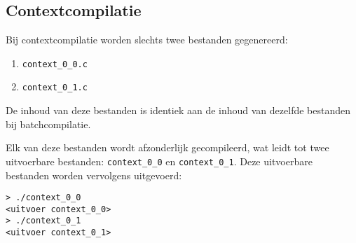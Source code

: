 \subsection{Contextcompilatie}\label{subsec:echo-contextcompilatie}

Bij contextcompilatie worden slechts twee bestanden gegenereerd:

\begin{enumerate}
    \item \texttt{context\_0\_0.c}
    \item \texttt{context\_0\_1.c}
\end{enumerate}

De inhoud van deze bestanden is identiek aan de inhoud van dezelfde bestanden bij batchcompilatie.

Elk van deze bestanden wordt afzonderlijk gecompileerd, wat leidt tot twee uitvoerbare bestanden: \texttt{context\_0\_0} en \texttt{context\_0\_1}.
Deze uitvoerbare bestanden worden vervolgens uitgevoerd:

\begin{verbatim}
> ./context_0_0
<uitvoer context_0_0>
> ./context_0_1
<uitvoer context_0_1>
\end{verbatim}
